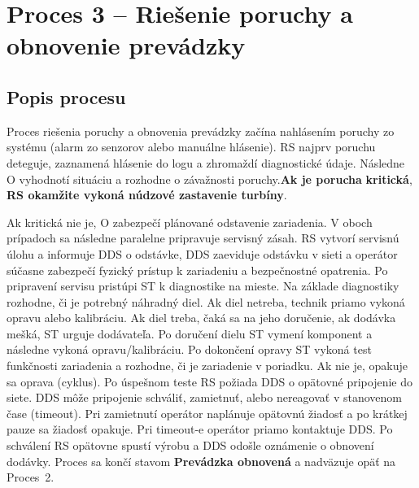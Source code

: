 \documentclass[12pt,a4paper]{article}
\begin{document}
\newpage
\section{Proces 3 -- Riešenie poruchy a obnovenie prevádzky}
\subsection{Popis procesu}
Proces riešenia poruchy a obnovenia prevádzky začína nahlásením poruchy
zo systému (alarm zo senzorov alebo manuálne hlásenie). RS najprv poruchu deteguje, zaznamená hlásenie do logu a zhromaždí
diagnostické údaje. Následne O vyhodnotí situáciu
a rozhodne o závažnosti poruchy.\textbf{Ak je porucha} \textbf{kritická}, \textbf{RS okamžite vykoná núdzové zastavenie turbíny}.

Ak kritická nie je, O zabezpečí plánované odstavenie zariadenia.
V oboch prípadoch sa následne paralelne pripravuje servisný zásah.
RS vytvorí servisnú úlohu a informuje DDS o odstávke, DDS zaeviduje odstávku v sieti a operátor súčasne zabezpečí fyzický prístup k zariadeniu a bezpečnostné opatrenia. Po pripravení servisu pristúpi ST k diagnostike na mieste. Na základe diagnostiky rozhodne, či je potrebný náhradný diel. Ak diel netreba, technik priamo vykoná opravu alebo kalibráciu. Ak diel treba, čaká sa na jeho doručenie, ak dodávka mešká, ST urguje dodávateľa. Po doručení dielu ST vymení komponent
a následne vykoná opravu/kalibráciu. Po dokončení opravy ST vykoná
test funkčnosti zariadenia a rozhodne, či je zariadenie v poriadku.
Ak nie je, opakuje sa oprava (cyklus). Po úspešnom teste RS požiada DDS o opätovné pripojenie do siete.
DDS môže pripojenie schváliť, zamietnuť, alebo nereagovať v stanovenom
čase (timeout). Pri zamietnutí operátor naplánuje opätovnú žiadosť
a po krátkej pauze sa žiadosť opakuje. Pri timeout-e operátor priamo
kontaktuje DDS. Po schválení RS opätovne spustí výrobu a DDS odošle
oznámenie o obnovení dodávky. Proces sa končí stavom \textbf{Prevádzka
obnovená} a nadväzuje opäť na Proces~2.

\clearpage
\end{document}
